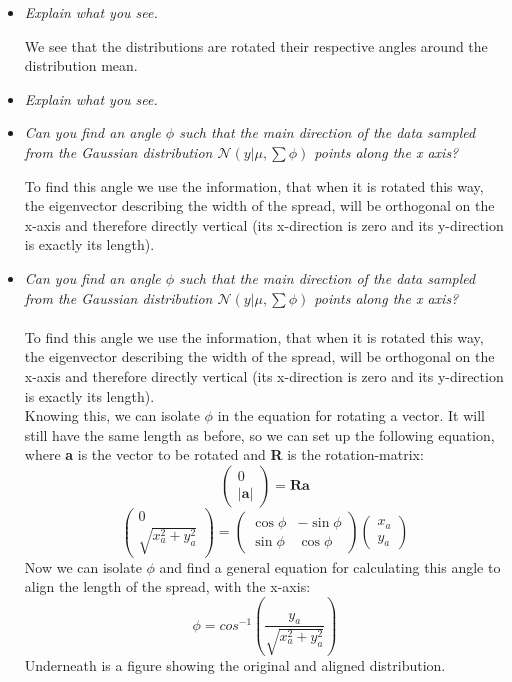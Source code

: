 \documentclass[12pt, a4paper]{article}
\begin{document}
\begin{itemize}
\item \textit{Explain what you see.}

We see that the distributions are rotated their respective angles around the distribution mean.

\item \textit{Explain what you see.}
\item \textit{Can you find an angle $\phi$ such that the main direction of the data sampled from the Gaussian distribution $\mathcal{N}(y|\mu, \sum \phi )$ points along the x axis?}

To find this angle we use the information, that when it is rotated this way, the eigenvector describing the width of the spread, will be orthogonal on the x-axis and therefore directly vertical (its x-direction is zero and its y-direction is exactly its length).

\item \textit{Can you find an angle $\phi$ such that the main direction of the data sampled from
the Gaussian distribution $\mathcal{N}(y|\mu, \sum \phi )$ points along the x axis?}\\\\
To find this angle we use the information, that when it is rotated this way, the eigenvector describing the width of the spread, will be orthogonal on the x-axis and therefore directly vertical (its x-direction is zero and its y-direction is exactly its length).\\

Knowing this, we can isolate $\phi$ in the equation for rotating a vector. It will still have the same length as before, so we can set up the following equation, where \textbf{a} is the vector to be rotated and \textbf{R} is the rotation-matrix:
\begin{equation*}
\left( \begin{array}{c}
0 \\
|\textbf{a}| \end{array} \right)
=
\textbf{R}\textbf{a}
\end{equation*}
\begin{equation*}
\left( \begin{array}{c}
0 \\
\sqrt{x_a^2+y_a^2} 
\end{array} \right)
=
\left( \begin{array}{cc}
\cos \phi & -\sin \phi \\
\sin \phi & \cos \phi \end{array} \right)
\left( \begin{array}{c}
x_a \\
y_a \end{array} \right)
\end{equation*} 
Now we can isolate $\phi$ and find a general equation for calculating this angle to align the length of the spread, with the x-axis:
\begin{equation*}
\phi = cos^{-1}\left(\dfrac{y_a}{\sqrt{x_a^2+y_a^2}}\right)
\end{equation*} 
Underneath is a figure showing the original and aligned distribution.


\end{itemize}
\end{document}

